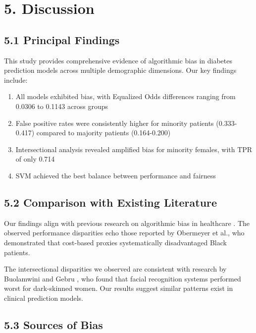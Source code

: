 \documentclass[12pt,a4paper]{article}
\begin{document}
\section{5. Discussion}

\subsection{5.1 Principal Findings}

This study provides comprehensive evidence of algorithmic bias in diabetes 
prediction models across multiple demographic dimensions. Our key findings 
include:

\begin{enumerate}
    \item All models exhibited bias, with Equalized Odds differences ranging 
          from 0.0306 to 0.1143 across groups
    \item False positive rates were consistently higher for minority patients 
          (0.333-0.417) compared to majority patients (0.164-0.200)
    \item Intersectional analysis revealed amplified bias for minority females, 
          with TPR of only 0.714
    \item SVM achieved the best balance between performance and fairness
\end{enumerate}

\subsection{5.2 Comparison with Existing Literature}

Our findings align with previous research on algorithmic bias in healthcare 
\cite{obermeyer2019, chen2019, rajkomar2018}. The observed performance 
disparities echo those reported by Obermeyer et al., who demonstrated that 
cost-based proxies systematically disadvantaged Black patients.

The intersectional disparities we observed are consistent with research by 
Buolamwini and Gebru \cite{buolamwini2018}, who found that facial recognition 
systems performed worst for dark-skinned women. Our results suggest similar 
patterns exist in clinical prediction models.

\subsection{5.3 Sources of Bias}
\end{document}
